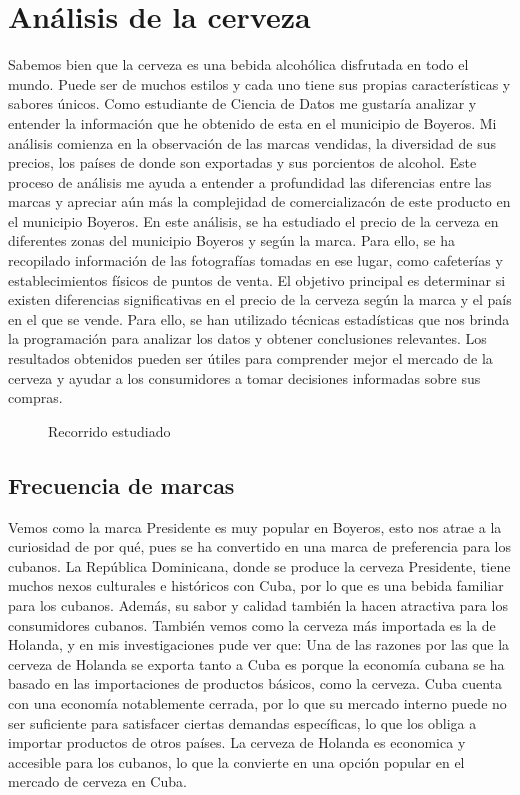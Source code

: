 \documentclass[]{article}
\begin{document}
 \section{Análisis de la cerveza}\label{sec:ent}
 Sabemos bien que la cerveza es una bebida alcohólica disfrutada en todo el mundo. Puede ser de muchos estilos y cada uno tiene sus propias características y sabores únicos. Como estudiante de Ciencia de Datos me gustaría analizar y entender la información que he obtenido de esta en el municipio de Boyeros. Mi análisis comienza en la observación de las marcas vendidas, la diversidad de sus precios, los países de donde son exportadas y sus porcientos de alcohol. Este proceso de análisis me ayuda a entender a profundidad las diferencias entre las marcas y apreciar aún más la complejidad de comercializacón de este producto en el municipio Boyeros.
 En este análisis, se ha estudiado el precio de la cerveza en diferentes zonas del municipio Boyeros y según la marca. Para ello, se ha recopilado información de las fotografías tomadas en ese lugar, como cafeterías y establecimientos físicos de puntos de venta. El objetivo principal es determinar si existen diferencias significativas en el precio de la cerveza según la marca y el país en el que se vende. Para ello, se han utilizado técnicas estadísticas que nos brinda la programación para analizar los datos y obtener conclusiones relevantes. Los resultados obtenidos pueden ser útiles para comprender mejor el mercado de la cerveza y ayudar a los consumidores a tomar decisiones informadas sobre sus compras.
  \begin{figure}[h]
 	\caption{Recorrido estudiado}
 	\label{fig:logo}
 \end{figure}
 \subsection{Frecuencia de marcas}\label{sub:center}
 Vemos como la marca Presidente es muy popular en Boyeros, esto nos atrae a la curiosidad de por qué, pues se ha convertido en una marca de preferencia para los cubanos. La República Dominicana, donde se produce la cerveza Presidente, tiene muchos nexos culturales e históricos con Cuba, por lo que es una bebida familiar para los cubanos. Además, su sabor y calidad también la hacen atractiva para los consumidores cubanos. 
 También vemos como la cerveza más importada es la de Holanda, y en mis investigaciones pude ver que: Una de las razones por las que la cerveza de Holanda se exporta tanto a Cuba es porque la economía cubana se ha basado en las importaciones de productos básicos, como la cerveza. Cuba cuenta con una economía notablemente cerrada, por lo que su mercado interno puede no ser suficiente para satisfacer ciertas demandas específicas, lo que los obliga a importar productos de otros países. La cerveza de Holanda es economica y accesible para los cubanos, lo que la convierte en una opción popular en el mercado de cerveza en Cuba.
\end{document}
